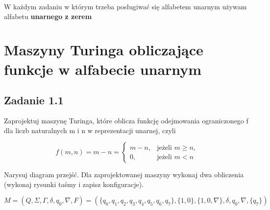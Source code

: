 \documentclass[leqno]{article}
\begin{document}
    \tableofcontents
    \newpage


    \begin{center}
        W każdym zadaniu w którym trzeba posługiwać się alfabetem unarnym używam alfabetu \textbf{unarnego z zerem}
    \end{center}

    \section{Maszyny Turinga obliczające funkcje w alfabecie unarnym}
        \subsection{Zadanie 1.1}
            Zaprojektuj maszynę Turinga, które oblicza funkcję odejmowania
            ograniczonego f dla liczb naturalnych m i n w reprezentacji unarnej, czyli
            
            \begin{equation}
                f(m, n) = m - n = 
                \begin{cases} 
                    m-n,  & \text{jeżeli } m \ge n, \\
                    0,    & \text{jeżeli } m < n
                \end{cases}
            \end{equation}

            Narysuj diagram przejść. Dla zaprojektowanej maszyny wykonaj dwa obliczenia 
            (wykonaj rysunki taśmy i zapisz konfiguracje).

            \begin{equation}
                M = (Q, \Sigma, \Gamma, \delta, q_0, \nabla, F) = (
                    \{q_0, q_1, q_2, q_3, q_4, q_5, q_6, q_7\}, 
                    \{1, 0\}, 
                    \{1, 0, \nabla\}, 
                    \delta, 
                    q_0, 
                    \nabla, 
                    \{q_7\}
                )
            \end{equation}
\end{document}
